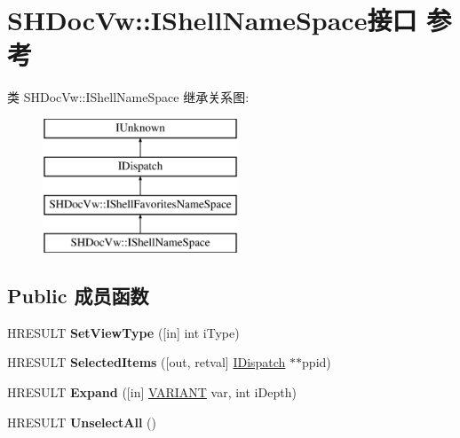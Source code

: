 \hypertarget{interface_s_h_doc_vw_1_1_i_shell_name_space}{}\section{S\+H\+Doc\+Vw\+:\+:I\+Shell\+Name\+Space接口 参考}
\label{interface_s_h_doc_vw_1_1_i_shell_name_space}
类 S\+H\+Doc\+Vw\+:\+:I\+Shell\+Name\+Space 继承关系图\+:\begin{figure}[H]
\begin{center}
\leavevmode
\includegraphics[height=4.000000cm]{interface_s_h_doc_vw_1_1_i_shell_name_space}
\end{center}
\end{figure}
\subsection*{Public 成员函数}
\begin{DoxyCompactItemize}
\item 
\mbox{\label{interface_s_h_doc_vw_1_1_i_shell_name_space_afe9e920f431837009760cc3e61a61512}} 
H\+R\+E\+S\+U\+LT {\bfseries Set\+View\+Type} (\mbox{[}in\mbox{]} int i\+Type)
\item 
\mbox{\label{interface_s_h_doc_vw_1_1_i_shell_name_space_ac6a3ea6c498d4317028ff43526c86193}} 
H\+R\+E\+S\+U\+LT {\bfseries Selected\+Items} (\mbox{[}out, retval\mbox{]} \hyperlink{interface_i_dispatch}{I\+Dispatch} $\ast$$\ast$ppid)
\item 
\mbox{\label{interface_s_h_doc_vw_1_1_i_shell_name_space_a0c0fde07359d847aa98281eeed84f954}} 
H\+R\+E\+S\+U\+LT {\bfseries Expand} (\mbox{[}in\mbox{]} \hyperlink{structtag_v_a_r_i_a_n_t}{V\+A\+R\+I\+A\+NT} var, int i\+Depth)
\item 
\mbox{\label{interface_s_h_doc_vw_1_1_i_shell_name_space_a9306676f8f13d559207c150162098584}} 
H\+R\+E\+S\+U\+LT {\bfseries Unselect\+All} ()
\end{DoxyCompactItemize}
